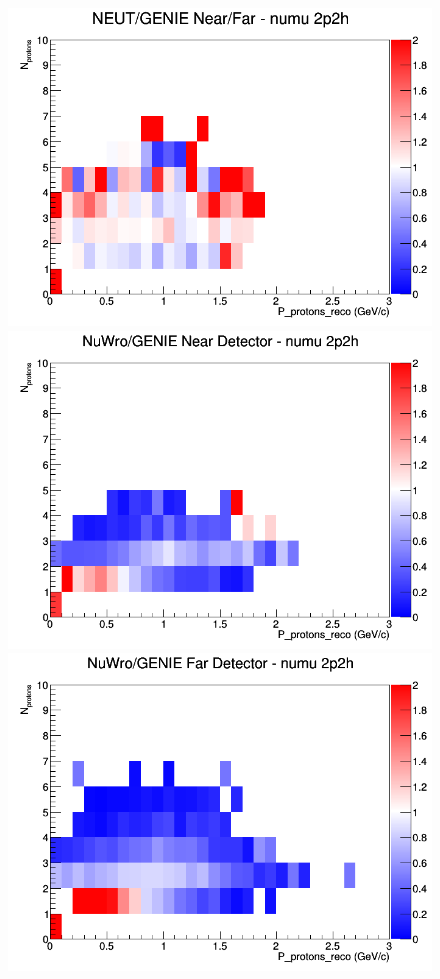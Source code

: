 \documentclass[12pt]{article}
\begin{document}
\begin{figure}[h]
\endminipage
{}
\includegraphics[width=\linewidth]{eff_N_P/FGT/protons/ratios/2p2h_NEUT_GENIE_numu_NF_N_P.png}
\endminipage
\newline
{}
\includegraphics[width=\linewidth]{eff_N_P/FGT/protons/ratios/2p2h_NuWro_GENIE_numu_near_N_P.png}
\endminipage
{}
\includegraphics[width=\linewidth]{eff_N_P/FGT/protons/ratios/2p2h_NuWro_GENIE_numu_far_N_P.png}

\end{figure}
\end{document}
